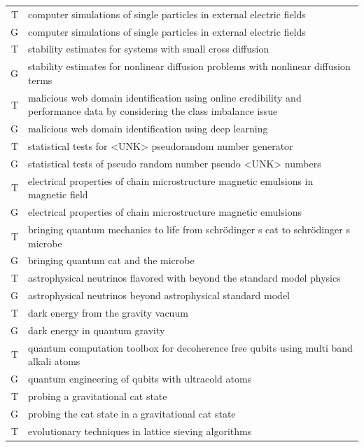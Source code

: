 \documentclass{article}
\begin{document}
\begin{center}
\begin{longtable}{r|p{15cm}}
        \hline
        T & computer simulations of single particles in external electric fields \\
        G & computer simulations of single particles in external electric fields\\
        \hline
        T & stability estimates for systems with small cross diffusion \\
        G & stability estimates for nonlinear diffusion problems with nonlinear diffusion terms\\
        \hline
        T & malicious web domain identification using online credibility and performance data by considering the class imbalance issue \\
        G & malicious web domain identification using deep learning\\
        \hline
        T & statistical tests for <UNK> pseudorandom number generator \\
        G & statistical tests of pseudo random number pseudo <UNK> numbers\\
        \hline
        T & electrical properties of chain microstructure magnetic emulsions in magnetic field \\
        G & electrical properties of chain microstructure magnetic emulsions\\
        \hline
        T & bringing quantum mechanics to life from schr\"{o}dinger s cat to schr\"{o}dinger s microbe \\
        G & bringing quantum cat and the microbe\\
        \hline
        T & astrophysical neutrinos flavored with beyond the standard model physics \\
        G & astrophysical neutrinos beyond astrophysical standard model\\
        \hline
        T & dark energy from the gravity vacuum \\
        G & dark energy in quantum gravity\\
        \hline
        T & quantum computation toolbox for decoherence free qubits using multi band alkali atoms \\
        G & quantum engineering of qubits with ultracold atoms\\
        \hline
        T & probing a gravitational cat state \\
        G & probing the cat state in a gravitational cat state\\
        \hline
        T & evolutionary techniques in lattice sieving algorithms \\

\end{longtable}
\end{center}
\end{document}
